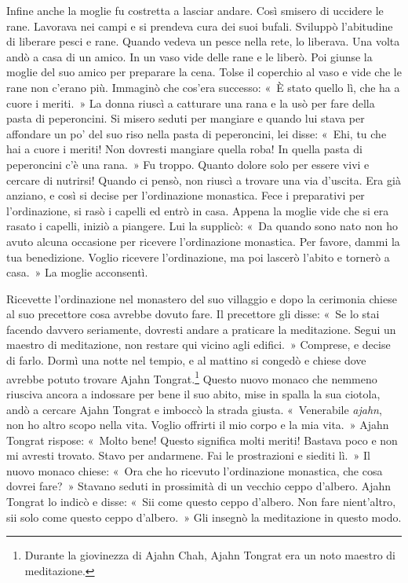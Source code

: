 Infine anche la moglie fu costretta a lasciar andare. Così smisero di
uccidere le rane. Lavorava nei campi e si prendeva cura dei suoi bufali.
Sviluppò l'abitudine di liberare pesci e rane. Quando vedeva un pesce
nella rete, lo liberava. Una volta andò a casa di un amico. In un vaso
vide delle rane e le liberò. Poi giunse la moglie del suo amico per
preparare la cena. Tolse il coperchio al vaso e vide che le rane non
c'erano più. Immaginò che cos'era successo: «~È stato quello lì, che ha
a cuore i meriti.~» La donna riuscì a catturare una rana e la usò per
fare della pasta di peperoncini. Si misero seduti per mangiare e quando
lui stava per affondare un po' del suo riso nella pasta di peperoncini,
lei disse: «~Ehi, tu che hai a cuore i meriti! Non dovresti mangiare
quella roba! In quella pasta di peperoncini c'è una rana.~» Fu troppo.
Quanto dolore solo per essere vivi e cercare di nutrirsi! Quando ci
pensò, non riuscì a trovare una via d'uscita. Era già anziano, e così si
decise per l'ordinazione monastica. Fece i preparativi per
l'ordinazione, si rasò i capelli ed entrò in casa. Appena la moglie
vide che si era rasato i capelli, iniziò a piangere. Lui la supplicò:
«~Da quando sono nato non ho avuto alcuna occasione per ricevere
l'ordinazione monastica. Per favore, dammi la tua benedizione. Voglio
ricevere l'ordinazione, ma poi lascerò l'abito e tornerò a casa.~» La
moglie acconsentì.

Ricevette l'ordinazione nel monastero del suo villaggio e dopo la
cerimonia chiese al suo precettore cosa avrebbe dovuto fare. Il
precettore gli disse: «~Se lo stai facendo davvero seriamente, dovresti
andare a praticare la meditazione. Segui un maestro di meditazione, non
restare qui vicino agli edifici.~» Comprese, e decise di farlo. Dormì
una notte nel tempio, e al mattino si congedò e chiese dove avrebbe
potuto trovare Ajahn Tongrat.\footnote{Durante la giovinezza di Ajahn
  Chah, Ajahn Tongrat era un noto maestro di meditazione.} Questo nuovo
monaco che nemmeno riusciva ancora a indossare per bene il suo abito,
mise in spalla la sua ciotola, andò a cercare Ajahn Tongrat e imboccò la
strada giusta. «~Venerabile \emph{ajahn}, non ho altro scopo nella vita.
Voglio offrirti il mio corpo e la mia vita.~» Ajahn Tongrat rispose:
«~Molto bene! Questo significa molti meriti! Bastava poco e non mi
avresti trovato. Stavo per andarmene. Fai le prostrazioni e siediti
lì.~» Il nuovo monaco chiese: «~Ora che ho ricevuto l'ordinazione
monastica, che cosa dovrei fare?~» Stavano seduti in prossimità di un
vecchio ceppo d'albero. Ajahn Tongrat lo indicò e disse: «~Sii come
questo ceppo d'albero. Non fare nient'altro, sii solo come questo ceppo
d'albero.~» Gli insegnò la meditazione in questo modo.

